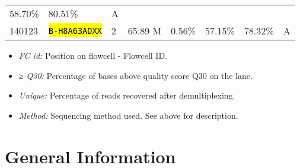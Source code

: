 \documentclass[12pt]{article}
\let\OldTexttt\texttt
\renewcommand{\texttt}[1]{\OldTexttt{\small\hl{#1}}}
\begin{document}
\begin{longtable}[c]{@{}llllllll@{}}
\begin{minipage}[t]{0.09\columnwidth}
58.70\%
\strut\end{minipage} &
\begin{minipage}[t]{0.12\columnwidth}\raggedright\strut
80.51\%
\strut\end{minipage} &
\begin{minipage}[t]{0.09\columnwidth}\raggedright\strut
A
\strut\end{minipage}\tabularnewline
\begin{minipage}[t]{0.08\columnwidth}\raggedright\strut
140123
\strut\end{minipage} &
\begin{minipage}[t]{0.13\columnwidth}\raggedright\strut
\texttt{B-H8A63ADXX}
\strut\end{minipage} &
\begin{minipage}[t]{0.07\columnwidth}\raggedright\strut
2
\strut\end{minipage} &
\begin{minipage}[t]{0.11\columnwidth}\raggedright\strut
65.89 M
\strut\end{minipage} &
\begin{minipage}[t]{0.09\columnwidth}\raggedright\strut
0.56\%
\strut\end{minipage} &
\begin{minipage}[t]{0.09\columnwidth}\raggedright\strut
57.15\%
\strut\end{minipage} &
\begin{minipage}[t]{0.12\columnwidth}\raggedright\strut
78.32\%
\strut\end{minipage} &
\begin{minipage}[t]{0.09\columnwidth}\raggedright\strut
A
\strut\end{minipage}\tabularnewline
\bottomrule
\end{longtable}

\begin{itemize}
\itemsep1pt\parskip0pt
\item
  \emph{FC id:} Position on flowcell - Flowcell ID.
\item
  \emph{≥ Q30:} Percentage of bases above quality score Q30 on the lane.
\item
  \emph{Unique:} Percentage of reads recovered after demultiplexing.
\item
  \emph{Method:} Sequencing method used. See above for description.
\end{itemize}

\section{General Information}\label{general-information}
\end{document}
